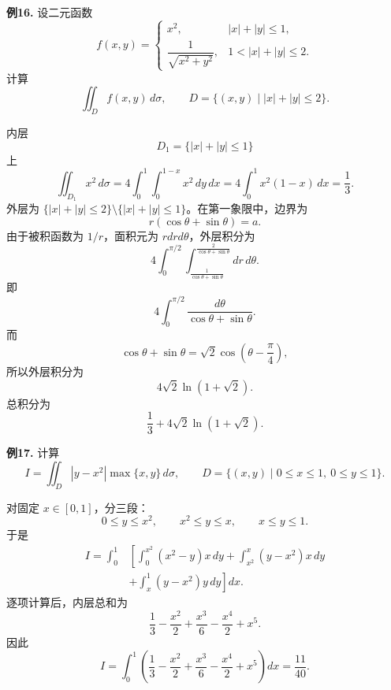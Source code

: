 \begin{problemblock}
\textbf{例16.} 设二元函数
\[
f(x,y)=
\begin{cases}
x^2,& |x|+|y|\le1,\\[2mm]
\dfrac1{\sqrt{x^2+y^2}},&1<|x|+|y|\le2.
\end{cases}
\]
计算
\[
\iint_D f(x,y)\,d\sigma,\qquad
D=\{(x,y)\mid |x|+|y|\le2\}.
\]
\end{problemblock}
\begin{solutionblock}
内层
\[
D_1=\{|x|+|y|\le1\}
\]
上
\[
\iint_{D_1}x^2\,d\sigma
=4\int_0^1\int_0^{1-x}x^2\,dy\,dx
=4\int_0^1x^2(1-x)\,dx=\frac13.
\]
外层为 \(\{|x|+|y|\le2\}\setminus\{|x|+|y|\le1\}\)。在第一象限中，边界为
\[
r(\cos\theta+\sin\theta)=a.
\]
由于被积函数为 \(1/r\)，面积元为 \(rdrd\theta\)，外层积分为
\[
4\int_0^{\pi/2}\int_{\frac1{\cos\theta+\sin\theta}}^{\frac2{\cos\theta+\sin\theta}}dr\,d\theta.
\]
即
\[
4\int_0^{\pi/2}\frac{d\theta}{\cos\theta+\sin\theta}.
\]
而
\[
\cos\theta+\sin\theta=\sqrt2\cos\left(\theta-\frac\pi4\right),
\]
所以外层积分为
\[
4\sqrt2\ln(1+\sqrt2).
\]
总积分为
\[
\frac13+4\sqrt2\ln(1+\sqrt2).
\]
\end{solutionblock}

\begin{problemblock}
\textbf{例17.} 计算
\[
I=\iint_D |y-x^2|\max\{x,y\}\,d\sigma,
\qquad
D=\{(x,y)\mid 0\le x\le1,\ 0\le y\le1\}.
\]
\end{problemblock}
\begin{solutionblock}
对固定 \(x\in[0,1]\)，分三段：
\[
0\le y\le x^2,\qquad x^2\le y\le x,\qquad x\le y\le1.
\]
于是
\[
\begin{aligned}
I=\int_0^1&\left[
\int_0^{x^2}(x^2-y)x\,dy
+\int_{x^2}^{x}(y-x^2)x\,dy\right.\\
&\left.+\int_x^1(y-x^2)y\,dy
\right]dx.
\end{aligned}
\]
逐项计算后，内层总和为
\[
\frac13-\frac{x^2}{2}+\frac{x^3}{6}-\frac{x^4}{2}+x^5.
\]
因此
\[
I=\int_0^1\left(
\frac13-\frac{x^2}{2}+\frac{x^3}{6}-\frac{x^4}{2}+x^5
\right)dx
=\frac{11}{40}.
\]
\end{solutionblock}

